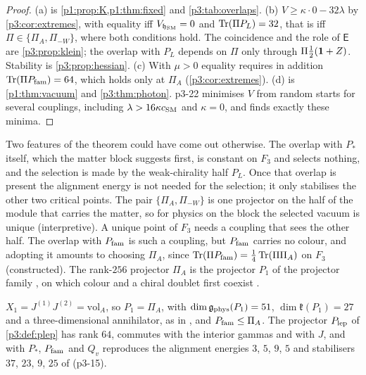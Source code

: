 \begin{proof}
(a) is \cref{p1:prop:K,p1:thm:fixed} and \cref{p3:tab:overlaps}. (b) $V\ge\kappa\cdot0-32\lambda$ by \cref{p3:cor:extremes}, with equality iff $V_{\mathfrak h_{\rm SM}}=0$ and
$\operatorname{Tr}(\Pi P_L)=32$, that is iff $\Pi\in\{\Pi_A,\Pi_{-W}\}$, where both conditions hold. The coincidence and the role of $\mathsf E$ are \cref{p3:prop:klein}; the overlap with $P_L$
depends on $\Pi$ only through $\Pi\tfrac12(\mathbf 1+Z)$. Stability is \cref{p3:prop:hessian}. (c) With $\mu>0$ equality requires in addition $\operatorname{Tr}(\Pi P_{\rm fam})=64$, which holds only at
$\Pi_A$ (\cref{p3:cor:extremes}). (d) is \cref{p1:thm:vacuum} and \cref{p3:thm:photon}. p3-22 minimises $V$ from random starts for several couplings, including
$\lambda>16\kappa c_{\rm SM}$ and $\kappa=0$, and finds exactly these minima.
\end{proof}

Two features of the theorem could have come out otherwise. The overlap with $P_*$ itself, which the matter block suggests first, is constant on $F_3$ and selects nothing,
and the selection is made by the weak-chirality half $P_L$. Once that overlap is present the alignment energy is not needed for the selection; it only stabilises the
other two critical points. The pair $\{\Pi_A,\Pi_{-W}\}$ is one projector on the half of the module that carries the matter, so for physics on the block the selected
vacuum is unique (interpretive). A unique point of $F_3$ needs a coupling that sees the other half. The overlap with $P_{\rm fam}$ is such a coupling, but $P_{\rm fam}$ carries no colour,
and adopting it amounts to choosing $\Pi_A$, since $\operatorname{Tr}(\Pi P_{\rm fam})=\tfrac14\operatorname{Tr}(\Pi\Pi_A)$ on $F_3$ (constructed). The rank-$256$ projector $\Pi_A$ is the projector $P_1$ of the
projector family \cite[Thm.~7.5]{ES17}, on which colour and a chiral doublet first coexist \cite[Thms.~7.7, 7.9]{ES17}.

\begin{proposition}
\label{p3:prop:restated}
$X_1=J^{(1)}J^{(2)}=\mathrm{vol}_A$, so $P_1=\Pi_A$, with $\dim\mathfrak g_{\rm phys}(P_1)=51$, $\dim\mathfrak k(P_1)=27$ and a three-dimensional annihilator, as in
\cite[Thm.~7.5]{ES17}, and $P_{\rm fam}\le\Pi_A$. The projector $P_{\rm lep}$ of \cref{p3:def:plep} has rank $64$, commutes with the interior gammas and with $J$, and with $P_*$,
$P_{\rm fam}$ and $Q_v$ reproduces the alignment energies $3$, $5$, $9$, $5$ and stabilisers $37$, $23$, $9$, $25$ of \cite[Prop.~21.6]{ES17} (p3-15).
\end{proposition}

